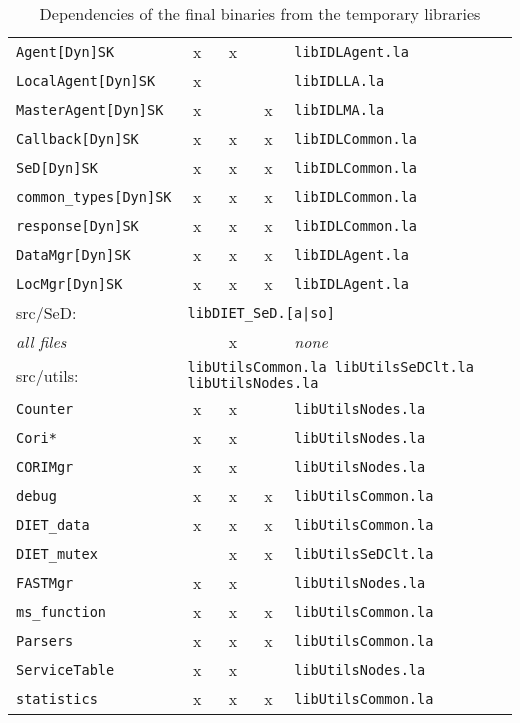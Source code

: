 \begin{table}[h]
\begin{tabular}[c]{|l|c|c|c|l|}
  \texttt{Agent[Dyn]SK}           & x & x &   & \texttt{libIDLAgent.la}\\
  \texttt{LocalAgent[Dyn]SK}      & x &   &   & \texttt{libIDLLA.la}\\
  \texttt{MasterAgent[Dyn]SK}     & x &   & x & \texttt{libIDLMA.la}\\
  \texttt{Callback[Dyn]SK}        & x & x & x & \texttt{libIDLCommon.la}\\
  \texttt{SeD[Dyn]SK}             & x & x & x & \texttt{libIDLCommon.la}\\
  \texttt{common\_types[Dyn]SK}   & x & x & x & \texttt{libIDLCommon.la}\\
  \texttt{response[Dyn]SK}        & x & x & x & \texttt{libIDLCommon.la}\\
  \texttt{DataMgr[Dyn]SK}        & x & x & x & \texttt{libIDLAgent.la}\\
  \texttt{LocMgr[Dyn]SK}        & x & x & x & \texttt{libIDLAgent.la}\\[5pt]
  \hline


  \multicolumn{1}{|l}{\textsf{src/SeD}:} &
  \multicolumn{4}{l|}{\texttt{libDIET\_SeD.[a|so]}}\\[5pt]

  \textit{all files}              &   & x &   & \emph{none}\\[5pt]
  \hline


  \multicolumn{1}{|l}{\textsf{src/utils}:} &
  \multicolumn{4}{l|}{\texttt{libUtilsCommon.la
                             libUtilsSeDClt.la  libUtilsNodes.la}}\\[5pt]

  \texttt{Counter}                & x & x &   & \texttt{libUtilsNodes.la}\\
  \texttt{Cori*}                  & x & x &   & \texttt{libUtilsNodes.la}\\
  \texttt{CORIMgr}                & x & x &   & \texttt{libUtilsNodes.la}\\
  \texttt{debug}                  & x & x & x & \texttt{libUtilsCommon.la}\\
  \texttt{DIET\_data}             & x & x & x & \texttt{libUtilsCommon.la}\\
  \texttt{DIET\_mutex}            &   & x & x & \texttt{libUtilsSeDClt.la}\\
  \texttt{FASTMgr}                & x & x &   & \texttt{libUtilsNodes.la}\\
  \texttt{ms\_function}           & x & x & x & \texttt{libUtilsCommon.la}\\
  \texttt{Parsers}                & x & x & x & \texttt{libUtilsCommon.la}\\
  \texttt{ServiceTable}           & x & x &   & \texttt{libUtilsNodes.la}\\
  \texttt{statistics}             & x & x & x & \texttt{libUtilsCommon.la}\\[5pt]
  \hline


 \end{tabular}
 \caption{Dependencies of the final binaries from the temporary
 libraries}
 \label{t:dep}
\end{table}


